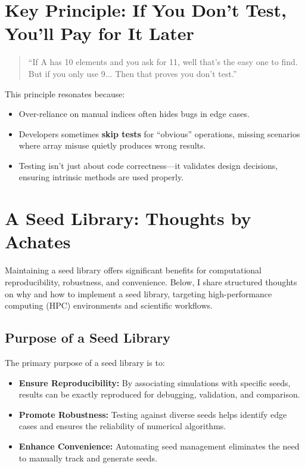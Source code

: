 \documentclass[12pt]{article}
\begin{document}
\section*{Key Principle: If You Don’t Test, You’ll Pay for It Later}

\begin{quote}

``If A has 10 elements and you ask for 11, well that's the easy one to find. But if you only use 9... Then that proves you don't test.''

\end{quote}



This principle resonates because:

\begin{itemize}

    \item Over-reliance on manual indices often hides bugs in edge cases.

    \item Developers sometimes \textbf{skip tests} for ``obvious'' operations, missing scenarios where array misuse quietly produces wrong results.

    \item Testing isn’t just about code correctness---it validates design decisions, ensuring intrinsic methods are used properly.

\end{itemize}
\section{A Seed Library: Thoughts by Achates}

Maintaining a seed library offers significant benefits for computational reproducibility, robustness, and convenience. Below, I share structured thoughts on why and how to implement a seed library, targeting high-performance computing (HPC) environments and scientific workflows.

\subsection{Purpose of a Seed Library}

The primary purpose of a seed library is to:
\begin{itemize}
    \item \textbf{Ensure Reproducibility:} By associating simulations with specific seeds, results can be exactly reproduced for debugging, validation, and comparison.
    \item \textbf{Promote Robustness:} Testing against diverse seeds helps identify edge cases and ensures the reliability of numerical algorithms.
    \item \textbf{Enhance Convenience:} Automating seed management eliminates the need to manually track and generate seeds.
\end{itemize}
\end{document}
